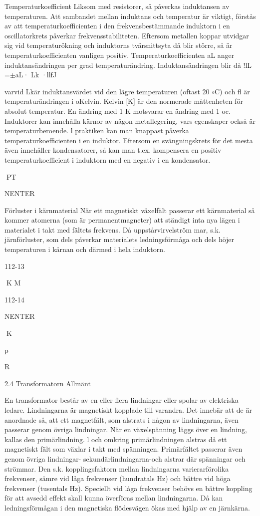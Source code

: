 \documentclass[a4paper,twoside,twocolumn,openright]{book}
\begin{document}
{{{Temperaturkoefficient
Liksom med resistorer, så påverkas induktansen av temperaturen. Att sambandet
mellan induktans och temperatur är viktigt,
förstås av att temperaturkoefficienten i den
frekvensbestämmande induktorn i en oscillatorkrets påverkar frekvensstabiliteten.
Eftersom metallen koppar utvidgar sig
vid temperaturökning och induktorns tvärsnittsyta då blir större, så är temperaturkoefficienten vanligen positiv.
Temperaturkoefficienten aL anger induktansändringen per grad temperaturändring.
Induktansändringen blir då
!lL =$\pm$aL· Lk ·llfJ

varvid Lkär induktansvärdet vid den lägre
temperaturen (oftast 20 $\circ$C) och fl{} är
temperaturändringen i oKelvin.
Kelvin [K] är den normerade måttenheten
för absolut temperatur. En ändring med 1 K
motsvarar en ändring med 1 oc.
Induktorer kan innehålla kärnor av någon
metallegering, vars egenskaper också är
temperaturberoende.
l praktiken kan man knappast påverka
temperaturkoefficienten i en induktor. Eftersom en svängningskrets för det mesta även
innehåller kondensatorer, så kan man t.ex.
kompensera en positiv temperaturkoefficient
i induktorn med en negativ i en kondensator.

PT

NENTER

Förluster i kärnmaterial
När ett magnetiskt växelfält passerar ett
kärnmaterial så kommer atomerna (som är
permanentmagneter) att ständigt inta nya
lägen i materialet i takt med fältets frekvens.
Då uppstårvirvelström mar, s.k. järnförluster,
som dels påverkar materialets ledningsförmåga och dels höjer temperaturen i kärnan och därmed i hela induktorn.

112-13

K M

112-14

NENTER

K

p

R

2.4 Transformatorn
Allmänt

En transformator består av en eller flera
lindningar eller spolar av elektriska ledare.
Lindningarna är magnetiskt kopplade till varandra. Det innebär att de är anordnade så,
att ett magnetfält, som alstrats i någon av
lindningarna, även passerar genom övriga
lindningar.
När en växelspänning läggs över en lindning, kallas den primärlindning. l och omkring primärlindningen alstras då ett magnetiskt fält som växlar i takt med spänningen.
Primärfältet passerar även genom övriga
lindningar- sekundärlindningarna-och alstrar där spänningar och strömmar.
Den s.k. kopplingsfaktorn mellan lindningarna varierarförolika frekvenser, sämre
vid låga frekvenser (hundratals Hz) och bättre vid höga frekvenser (tusentals Hz). Speciellt vid låga frekvenser behövs en bättre
koppling för att avsedd effekt skall kunna
överföras mellan lindningarna. Då kan ledningsförmågan i den magnetiska flödesvägen ökas med hjälp av en järnkärna.

}}}
\end{document}
